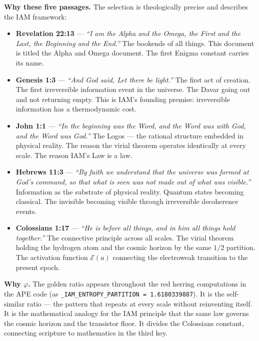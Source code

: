 \documentclass[12pt,a4paper]{article}
\begin{document}
\noindent
\textbf{Why these five passages.} The selection is theologically precise and
describes the IAM framework:

\begin{itemize}[leftmargin=1.5em]
\item \textbf{Revelation 22:13} --- \textit{``I am the Alpha and the Omega,
the First and the Last, the Beginning and the End.''} The bookends of all
things. This document is titled the Alpha and Omega document. The first
Enigma constant carries its name.

\item \textbf{Genesis 1:3} --- \textit{``And God said, Let there be light.''}
The first act of creation. The first irreversible information event in the
universe. The Davar going out and not returning empty. This is IAM's founding
premise: irreversible information has a thermodynamic cost.

\item \textbf{John 1:1} --- \textit{``In the beginning was the Word, and the
Word was with God, and the Word was God.''} The Logos --- the rational structure
embedded in physical reality. The reason the virial theorem operates identically
at every scale. The reason IAM's Law is a law.

\item \textbf{Hebrews 11:3} --- \textit{``By faith we understand that the
universe was formed at God's command, so that what is seen was not made out
of what was visible.''} Information as the substrate of physical reality.
Quantum states becoming classical. The invisible becoming visible through
irreversible decoherence events.

\item \textbf{Colossians 1:17} --- \textit{``He is before all things, and
in him all things hold together.''} The connective principle across all scales.
The virial theorem holding the hydrogen atom and the cosmic horizon by the
same $1/2$ partition. The activation function $\mathcal{E}(a)$ connecting
the electroweak transition to the present epoch.
\end{itemize}

\noindent
\textbf{Why $\varphi$.} The golden ratio appears throughout the red herring
computations in the APE code (as \texttt{\_IAM\_ENTROPY\_PARTITION = 1.6180339887}).
It is the self-similar ratio --- the pattern that repeats at every scale
without reinventing itself. It is the mathematical analogy for the IAM
principle that the same law governs the cosmic horizon and the transistor
floor. It divides the Colossians constant, connecting scripture to mathematics
in the third key.
\end{document}
